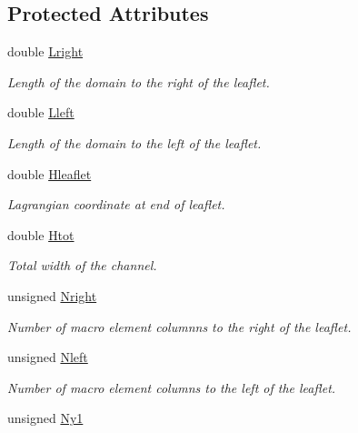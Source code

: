 \subsection*{Protected Attributes}
\begin{DoxyCompactItemize}
\item 
double \hyperlink{classoomph_1_1ChannelWithLeafletDomain_a6c1a799bbedc5f0ff08f38088eaedc68}{Lright}
\begin{DoxyCompactList}\small\item\em Length of the domain to the right of the leaflet. \end{DoxyCompactList}\item 
double \hyperlink{classoomph_1_1ChannelWithLeafletDomain_a0a50a8a7b274fb1dfc6d18c79ca884cd}{Lleft}
\begin{DoxyCompactList}\small\item\em Length of the domain to the left of the leaflet. \end{DoxyCompactList}\item 
double \hyperlink{classoomph_1_1ChannelWithLeafletDomain_a75ce3248efae5c33a9c9989b2f310139}{Hleaflet}
\begin{DoxyCompactList}\small\item\em Lagrangian coordinate at end of leaflet. \end{DoxyCompactList}\item 
double \hyperlink{classoomph_1_1ChannelWithLeafletDomain_ad32b0daa71b42d34aec81c7e3d25cb98}{Htot}
\begin{DoxyCompactList}\small\item\em Total width of the channel. \end{DoxyCompactList}\item 
unsigned \hyperlink{classoomph_1_1ChannelWithLeafletDomain_a11aac62965f9bcb7d4c0043669b28f15}{Nright}
\begin{DoxyCompactList}\small\item\em Number of macro element columnns to the right of the leaflet. \end{DoxyCompactList}\item 
unsigned \hyperlink{classoomph_1_1ChannelWithLeafletDomain_ad0abd8837f9f0924b801d2fb78c69532}{Nleft}
\begin{DoxyCompactList}\small\item\em Number of macro element columns to the left of the leaflet. \end{DoxyCompactList}\item 
unsigned \hyperlink{classoomph_1_1ChannelWithLeafletDomain_a3c6393ef6e626d7a2f2a8ea70c8addbe}{Ny1}

\end{DoxyCompactItemize}
